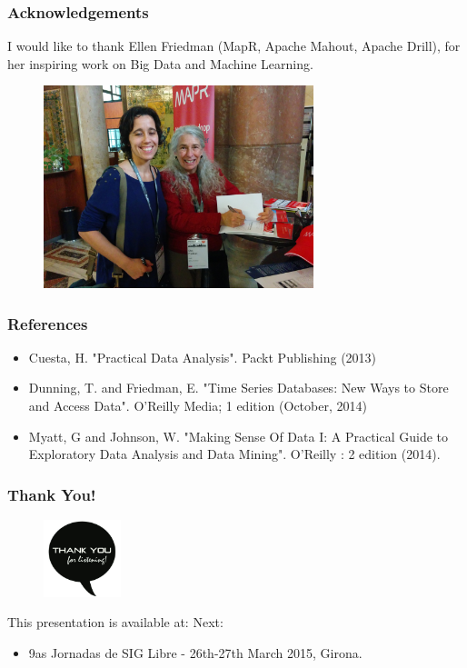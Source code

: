 \documentclass[hyperref={pdfpagelabels=true}]{beamer}
\begin{document}
\begin{frame}
\frametitle{Acknowledgements}
I would like to thank Ellen Friedman (MapR, Apache Mahout, Apache Drill), for her inspiring work on Big Data and Machine Learning.
    \begin{figure}   
      \includegraphics[width=0.7\textwidth]{nosql_matters.jpg}      
    \end{figure}   
\end{frame}

\begin{frame}
\frametitle{References}
\begin{itemize}
\item Cuesta, H. "Practical Data Analysis". Packt Publishing (2013)
\item Dunning, T. and Friedman, E. "Time Series Databases: New Ways to Store and Access Data". O'Reilly Media; 1 edition (October, 2014)
\item Myatt, G and Johnson, W. "Making Sense Of Data I: A Practical Guide to Exploratory Data Analysis and Data Mining". O'Reilly : 2 edition (2014).
\end{itemize}
\end{frame}

\begin{frame}
\frametitle{Thank You!}
    \begin{figure}   
      \includegraphics[width=0.2\textwidth]{thanks.jpg}      
    \end{figure}   
    This presentation is available at: 
      \vspace{5mm}    
    Next:
    \begin{itemize}    
      \item<2-> 9as Jornadas de SIG Libre -  26th-27th March 2015, Girona.
     \end{itemize}
\end{frame}
\end{document}
